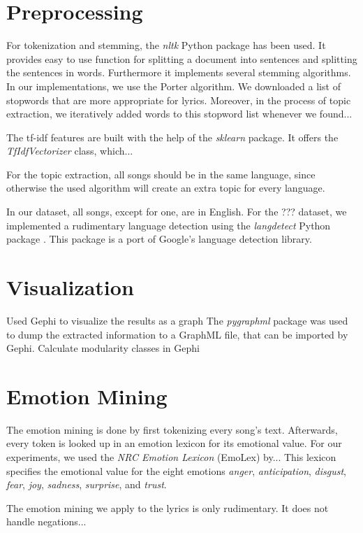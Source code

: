 \documentclass[10pt,a4paper]{article}
\begin{document}
	\section{Preprocessing}	
	For tokenization and stemming, the \textit{nltk} Python package has been used. It provides easy to use function for splitting a document into sentences and splitting the sentences in words. Furthermore it implements several stemming algorithms. In our implementations, we use the Porter algorithm. We downloaded a list of stopwords that are more appropriate for lyrics. Moreover, in the process of topic extraction, we iteratively added words to this stopword list whenever we found...
	
	The tf-idf features are built with the help of the \textit{sklearn} package. It offers the \textit{TfIdfVectorizer} class, which...
	
	For the topic extraction, all songs should be in the same language, since otherwise the used algorithm will create an extra topic for every language.
	
	In our dataset, all songs, except for one, are in English. For the ??? dataset, we implemented a rudimentary language detection using the \textit{langdetect} Python package \cite{langdetect}. This package is a port of Google's language detection library.
	
	\section{Visualization}
	Used Gephi to visualize the results as a graph
	The \textit{pygraphml} package was used to dump the extracted information to a GraphML file, that can be imported by Gephi.
	Calculate modularity classes in Gephi
	
	\section{Emotion Mining}
	The emotion mining is done by first tokenizing every song's text. Afterwards, every token is looked up in an emotion lexicon for its emotional value. For our experiments, we used the \textit{NRC Emotion Lexicon} (EmoLex) by... This lexicon specifies the emotional value for the eight emotions \textit{anger}, \textit{anticipation}, \textit{disgust}, \textit{fear}, \textit{joy}, \textit{sadness}, \textit{surprise}, and \textit{trust}.
	
	The emotion mining we apply to the lyrics is only rudimentary. It does not handle negations...
	
\end{document}
